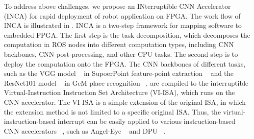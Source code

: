 To address above challenges, we propose an INterruptible CNN Accelerator (INCA) for rapid deployment of robot application on FPGA. 
The work flow of INCA is illustrated in . 
INCA is a two-step framework for mapping software to embedded FPGA. 
The first step is the task decomposition, which decomposes the computation in ROS nodes into different computation types, including CNN backbones, CNN post-processing, and other CPU tasks.
The second step is to deploy the computation onto the FPGA. 
The CNN backbones of different tasks, such as the VGG model  ~\cite{kim2016accurate} in SupoerPoint feature-point extraction  ~\cite{detone2018superpoint} and the ResNet101 model  ~\cite{he2016deep} in GeM place recognition  ~\cite{radenovic2018fine}, are compiled to the interruptible Virtual-Instruction Instruction Set Architecture (VI-ISA), which runs on the CNN accelerator. The VI-ISA is a simple extension of the original ISA, in which the extension method is not limited to a specific original ISA. Thus, the virtual-instruction-based interrupt can be easily applied to various instruction-based CNN accelerators  ~\cite{yu2018instruction,qiu2016going}, such as Angel-Eye ~\cite{guo2017angel} and DPU ~\cite{dpu}.





